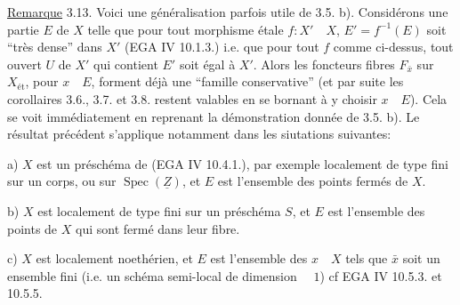 
\uline{Remarque} 3.13. Voici une généralisation parfois utile de 3.5. b). Considérons une partie $E$ de $X$ telle que pour tout morphisme étale $f:X'\quad X$, $E'=f^{-1}(E)$ soit ``très dense'' dans $X'$ (EGA IV 10.1.3.)\unsure{;} i.e. que pour tout $f$ comme ci-dessus, tout ouvert $U$ de $X'$ qui contient $E'$ soit égal à $X'$. Alors les foncteurs fibres $F_{\bar x}$ sur $X_{\text{ét}}$, pour $x\quad E$, forment déjà une ``famille conservative'' (et par suite les corollaires 3.6., 3.7. et 3.8. restent valables en se bornant à y choisir $x\quad E$). Cela se voit immédiatement en reprenant la démonstration donnée de 3.5. b). Le résultat précédent s'applique notamment dans les siutations suivantes:

a) $X$ est un préschéma de  (EGA IV 10.4.1.), par exemple localement de type fini sur un corps, ou sur $\operatorname{Spec}(\underline{Z})$, et $E$ est l'ensemble des points fermés de $X$.

b) $X$ est localement de type fini sur un préschéma $S$, et $E$ est l'ensemble des points de $X$ qui sont fermé dans leur fibre.

c) $X$ est localement noethérien, et $E$ est l'ensemble des $x\quad X$ tels que $\bar x$ soit un ensemble fini (i.e. un schéma semi-local de dimension $\quad 1$) cf EGA IV 10.5.3. et 10.5.5.
